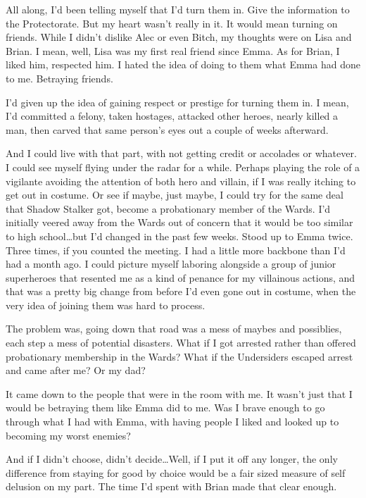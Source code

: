 All along, I'd been telling myself that I'd turn them in.  Give the information to the Protectorate.  But my heart wasn't really in it.  It would mean turning on friends.  While I didn't dislike Alec or even Bitch, my thoughts were on Lisa and Brian.  I mean, well, Lisa was my first real friend since Emma.  As for Brian, I liked him, respected him.   I hated the idea of doing to them what Emma had done to me.  Betraying friends.



I'd given up the idea of gaining respect or prestige for turning them in.  I mean, I'd committed a felony, taken hostages, attacked other heroes, nearly killed a man, then carved that same person's eyes out a couple of weeks afterward.



And I could live with that part, with not getting credit or accolades or whatever.  I could see myself flying under the radar for a while.  Perhaps playing the role of a vigilante avoiding the attention of both hero and villain, if I was really itching to get out in costume.  Or see if maybe, just maybe, I could try for the same deal that Shadow Stalker got, become a probationary member of the Wards.  I'd initially veered away from the Wards out of concern that it would be too similar to high school\ldots but I'd changed in the past few weeks.  Stood up to Emma twice.  Three times, if you counted the meeting.  I had a little more backbone than I'd had a month ago.  I could picture myself laboring alongside a group of junior superheroes that resented me as a kind of penance for my villainous actions, and that was a pretty big change from before I'd even gone out in costume, when the very idea of joining them was hard to process.



The problem was, going down that road was a mess of maybes and possiblies, each step a mess of potential disasters.  What if I got arrested rather than offered probationary membership in the Wards?  What if the Undersiders escaped arrest and came after me?  Or my dad?



It came down to the people that were in the room with me.  It wasn't just that I would be betraying them like Emma did to me.  Was I brave enough to go through what I had with Emma, with having people I liked and looked up to becoming my worst enemies?



And if I didn't choose, didn't decide\ldots Well, if I put it off any longer, the only difference from staying for good by choice would be a fair sized measure of self delusion on my part.  The time I'd spent with Brian made that clear enough.



